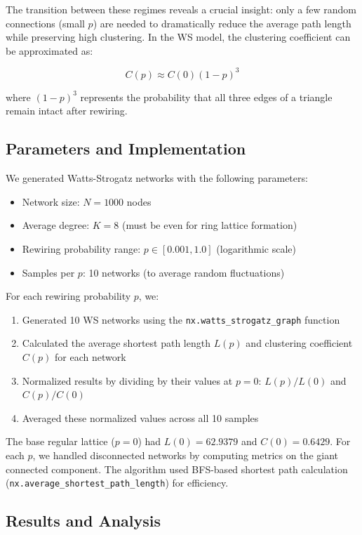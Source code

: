 \documentclass[11pt,a4paper]{article}
\begin{document}
The transition between these regimes reveals a crucial insight: only a few random connections (small $p$) are needed to dramatically reduce the average path length while preserving high clustering. In the WS model, the clustering coefficient can be approximated as:

\begin{equation}
C(p) \approx C(0)(1-p)^3
\end{equation}

where $(1-p)^3$ represents the probability that all three edges of a triangle remain intact after rewiring.


\subsection{Parameters and Implementation}
\indent

We generated Watts-Strogatz networks with the following parameters:
\begin{itemize}
    \item Network size: $N = 1000$ nodes
    \item Average degree: $K = 8$ (must be even for ring lattice formation)
    \item Rewiring probability range: $p \in [0.001, 1.0]$ (logarithmic scale)
    \item Samples per $p$: 10 networks (to average random fluctuations)
\end{itemize}

For each rewiring probability $p$, we:
\begin{enumerate}
    \item Generated 10 WS networks using the \texttt{nx.watts\_strogatz\_graph} function
    \item Calculated the average shortest path length $L(p)$ and clustering coefficient $C(p)$ for each network
    \item Normalized results by dividing by their values at $p=0$: $L(p)/L(0)$ and $C(p)/C(0)$
    \item Averaged these normalized values across all 10 samples
\end{enumerate}

The base regular lattice ($p=0$) had $L(0) = 62.9379$ and $C(0) = 0.6429$. For each $p$, we handled disconnected networks by computing metrics on the giant connected component. The algorithm used BFS-based shortest path calculation (\texttt{nx.average\_shortest\_path\_length}) for efficiency.

\subsection{Results and Analysis}
\end{document}
